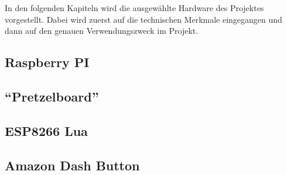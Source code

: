 
In den folgenden Kapiteln wird die ausgewählte Hardware des Projektes vorgestellt. Dabei wird zuerst auf die technischen Merkmale eingegangen und dann auf den genauen Verwendungszweck im Projekt. 

\subsection{Raspberry PI}        
\label{sec:Raspberry PI-1} 


\newpage

\subsection{``Pretzelboard''}        
\label{sec:Pretzelboard-1} 


\newpage

\subsection{ESP8266 Lua}
\label{sec:ESP8266}



\subsection{Amazon Dash Button}
\label{sec:Amazon Dash Button}


\newpage